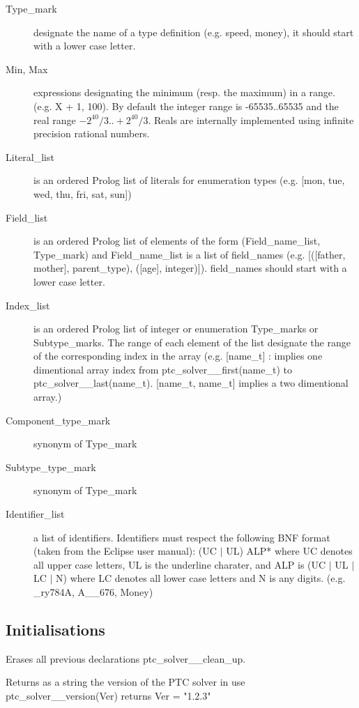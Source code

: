 \documentclass{article}
\begin{document}
\begin{description}
  \item [Type\_mark] designate the name of a type definition (e.g. speed,
  money), it should start with a lower case letter.
  \item [Min, Max] expressions designating the minimum (resp. the maximum) in a
range. (e.g. X + 1, 100). By default the integer range is -65535..65535 and the
real range $-2^{40}/3 .. +2^{40}/3$. Reals are internally implemented using
infinite precision rational numbers.
  \item [Literal\_list] is an ordered Prolog list of literals for enumeration
types (e.g. [mon, tue, wed, thu, fri, sat, sun])
  \item [Field\_list] is an ordered Prolog list of elements of the form
(Field\_name\_list, Type\_mark) and Field\_name\_list is a list of field\_names
(e.g. [([father, mother], parent\_type), ([age], integer)]). field\_names
should start with a lower case letter.
  \item [Index\_list] is an ordered Prolog list of integer or enumeration
Type\_marks or Subtype\_marks. The range of each element of the list designate
the range of the corresponding index in the array (e.g. [name\_t] : implies one
dimentional array index from ptc\_solver\_\_first(name\_t) to
ptc\_solver\_\_last(name\_t). [name\_t, name\_t] implies a two dimentional
array.)
  \item [Component\_type\_mark] synonym of Type\_mark
  \item [Subtype\_type\_mark] synonym of Type\_mark
  \item [Identifier\_list] a list of identifiers. Identifiers must respect the
following BNF format (taken from the Eclipse user manual): (UC $\mid$ UL) ALP*
where UC denotes all upper case letters, UL is the underline charater, and ALP
is (UC $\mid$ UL $\mid$ LC $\mid$ N) where LC denotes all lower case letters
and N is any digits. (e.g. \_ry784A, A\_\_676, Money)
\end{description}

\subsection{Initialisations}

\hspace{\parindent}
    {Erases all previous declarations}
    {ptc\_solver\_\_clean\_up.}
    {}

    {Returns as a string the version of the PTC solver in use}
    {ptc\_solver\_\_version(Ver) returns Ver = "1.2.3"}
    {}
\end{document}
